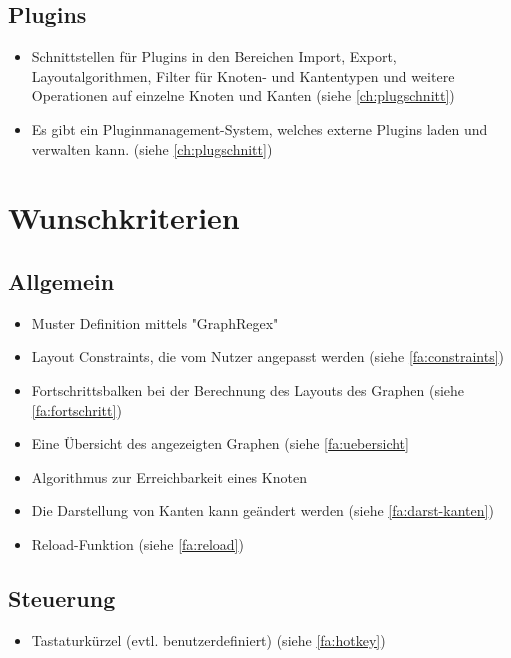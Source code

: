 \subsection{Plugins}
  \begin{itemize}
    \item Schnittstellen für Plugins in den Bereichen Import, Export, Layoutalgorithmen, Filter für Knoten- und Kantentypen und weitere Operationen auf einzelne Knoten und Kanten (siehe \ref{ch:plugschnitt})
    \item Es gibt ein Pluginmanagement-System, welches externe Plugins laden und verwalten kann. (siehe \ref{ch:plugschnitt})
  \end{itemize}

\section{Wunschkriterien}

\subsection{Allgemein}
  \begin{itemize}
    \item Muster Definition mittels "GraphRegex" %
    \item Layout Constraints, die vom Nutzer angepasst werden (siehe \ref{fa:constraints}) %
    \item Fortschrittsbalken bei der Berechnung des Layouts des Graphen (siehe \ref{fa:fortschritt})
    \item Eine Übersicht des angezeigten Graphen (siehe \ref{fa:uebersicht}
    \item Algorithmus zur Erreichbarkeit eines Knoten %
    \item Die Darstellung von Kanten kann geändert werden (siehe \ref{fa:darst-kanten})
    \item Reload-Funktion (siehe \ref{fa:reload})
  \end{itemize}

\subsection{Steuerung}
  \begin{itemize}
    \item Tastaturkürzel (evtl. benutzerdefiniert) (siehe \ref{fa:hotkey})
  \end{itemize}

